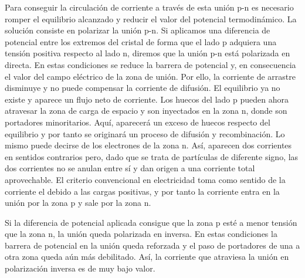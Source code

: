 Para conseguir la circulación de corriente a través de esta unión
p-n es necesario romper el equilibrio alcanzado y reducir el valor
del potencial termodinámico. La solución consiste en polarizar la
unión p-n. Si aplicamos una diferencia de potencial entre los extremos
del cristal de forma que el lado p adquiera una tensión positiva respecto
al lado n, diremos que la unión p-n está polarizada en directa. En
estas condiciones se reduce la barrera de potencial y, en consecuencia
el valor del campo eléctrico de la zona de unión. Por ello, la corriente
de arrastre disminuye y no puede compensar la corriente de difusión.
El equilibrio ya no existe y aparece un flujo neto de corriente. Los
huecos del lado p pueden ahora atravesar la zona de carga de espacio
y son inyectados en la zona n, donde son portadores minoritarios.
Aquí, aparecerá un exceso de huecos respecto del equilibrio y por
tanto se originará un proceso de difusión y recombinación. Lo mismo
puede decirse de los electrones de la zona n. Así, aparecen dos corrientes
en sentidos contrarios pero, dado que se trata de partículas de diferente
signo, las dos corrientes no se anulan entre sí y dan origen a una
corriente total aprovechable. El criterio convencional en electricidad
toma como sentido de la corriente el debido a las cargas positivas,
y por tanto la corriente entra en la unión por la zona p y sale por
la zona n.

Si la diferencia de potencial aplicada consigue que la zona p esté
a menor tensión que la zona n, la unión queda polarizada en inversa.
En estas condiciones la barrera de potencial en la unión queda reforzada
y el paso de portadores de una a otra zona queda aún más debilitado.
Así, la corriente que atraviesa la unión en polarización inversa es
de muy bajo valor.

